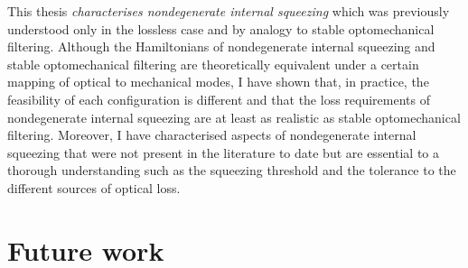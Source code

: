 This thesis \emph{characterises nondegenerate internal squeezing} which was previously understood only in the lossless case and by analogy to stable optomechanical filtering. Although the Hamiltonians of nondegenerate internal squeezing and stable optomechanical filtering are theoretically equivalent under a certain mapping of optical to mechanical modes, I have shown that, in practice, the feasibility of each configuration is different and that the loss requirements of nondegenerate internal squeezing are at least as realistic as stable optomechanical filtering. %
Moreover, I have characterised aspects of nondegenerate internal squeezing that were not present in the literature to date but are essential to a thorough understanding such as the squeezing threshold and the tolerance to the different sources of optical loss.



\section{Future work}
\label{sec:future_work}

